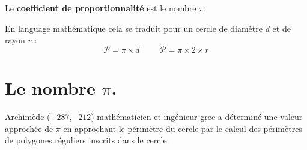 \begin{pageCours}
\begin{Pp}
Le \textbf{coefficient de proportionnalité} est le nombre $\pi$.
\end{Pp}

\begin{Nt}
En language mathématique cela se traduit pour un cercle de diamètre $d$ et de rayon $r$ :
\[\mathcal{P}=\pi \times d\hspace{1cm} \mathcal{P}=\pi\times 2\times r\]
\end{Nt}

\section{Le nombre $\pi$.}

\begin{His}
Archimède ($-287$,$-212$) mathématicien et ingénieur grec a déterminé une valeur approchée de $\pi$ en approchant le périmètre du cercle par le calcul des périmètres de polygones réguliers inscrits dans le cercle.


\end{His}
\end{pageCours}
